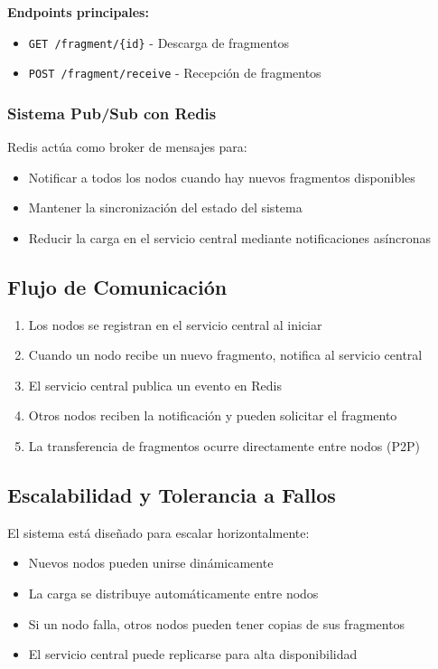 \textbf{Endpoints principales:}
\begin{itemize}
    \item \texttt{GET /fragment/\{id\}} - Descarga de fragmentos
    \item \texttt{POST /fragment/receive} - Recepción de fragmentos
\end{itemize}

\subsubsection*{Sistema Pub/Sub con Redis}
Redis actúa como broker de mensajes para:

\begin{itemize}
    \item Notificar a todos los nodos cuando hay nuevos fragmentos disponibles
    \item Mantener la sincronización del estado del sistema
    \item Reducir la carga en el servicio central mediante notificaciones asíncronas
\end{itemize}

\subsection*{Flujo de Comunicación}

\begin{enumerate}
    \item Los nodos se registran en el servicio central al iniciar
    \item Cuando un nodo recibe un nuevo fragmento, notifica al servicio central
    \item El servicio central publica un evento en Redis
    \item Otros nodos reciben la notificación y pueden solicitar el fragmento
    \item La transferencia de fragmentos ocurre directamente entre nodos (P2P)
\end{enumerate}

\subsection*{Escalabilidad y Tolerancia a Fallos}

El sistema está diseñado para escalar horizontalmente:

\begin{itemize}
    \item Nuevos nodos pueden unirse dinámicamente
    \item La carga se distribuye automáticamente entre nodos
    \item Si un nodo falla, otros nodos pueden tener copias de sus fragmentos
    \item El servicio central puede replicarse para alta disponibilidad
\end{itemize}